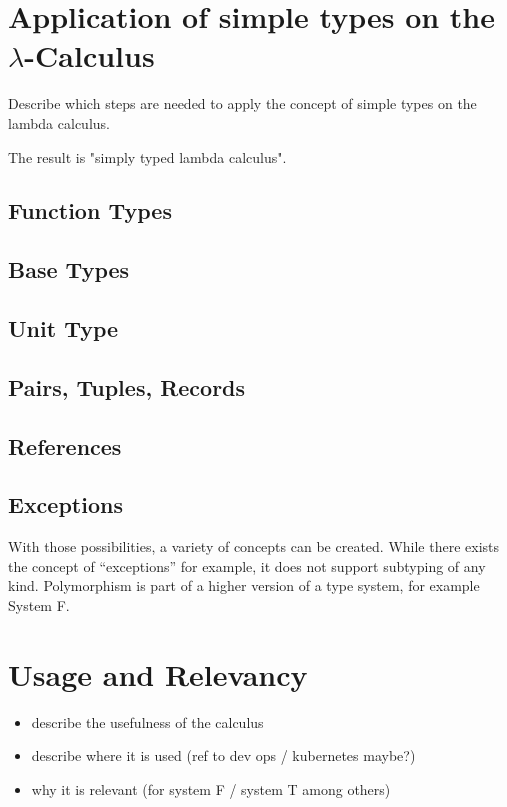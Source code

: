 \section{Application of simple types on the $\lambda$-Calculus}

Describe which steps are needed to apply the concept of simple types
on the lambda calculus.

The result is "simply typed lambda calculus".

\subsection{Function Types}

\subsection{Base Types}

\subsection{Unit Type}

\subsection{Pairs, Tuples, Records}

\subsection{References}

\subsection{Exceptions}

With those possibilities, a variety of concepts can be created.
While there exists the concept of ``exceptions'' for example, it does
not support subtyping of any kind. Polymorphism is part of a higher
version of a type system, for example System F.


\section{Usage and Relevancy}

\begin{itemize}
    \item describe the usefulness of the calculus
    \item describe where it is used (ref to dev ops / kubernetes maybe?)
    \item why it is relevant (for system F / system T among others)
\end{itemize}

